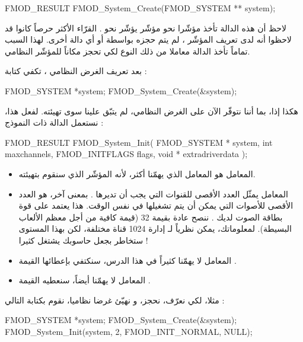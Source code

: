 \begin{Csource}
FMOD_RESULT FMOD_System_Create(FMOD_SYSTEM ** system);
\end{Csource}

لاحظ أن هذه الدالة تأخذ مؤشّرا نحو مؤشّر يؤشّر نحو
.
القرّاء الأكثر حرصاً كانوا قد لاحظوا أنه لدى تعريف المؤشّر
،
لم يتم حجزه بواسطة
أو أي دالة أخرى. لهذا السبب تماماً تأخذ الدالة
معاملا من ذلك النوع لكي تحجز مكاناً للمؤشّر النظامي.

بعد تعريف الغرض النظامي ، تكفي كتابة :

\begin{Csource}
FMOD_SYSTEM *system;
FMOD_System_Create(&system);
\end{Csource}

هكذا إذا، بما أننا نتوفّر الآن على الغرض النظامي، لم يتبّق علينا سوى تهيئته. لفعل هذا، نستعمل الدالة
ذات النموذج :
\begin{Csource}
FMOD_RESULT FMOD_System_Init(
	FMOD_SYSTEM *  system,
	int  maxchannels,
	FMOD_INITFLAGS  flags,
	void *  extradriverdata
);
\end{Csource}

\begin{itemize}
	\item المعامل
	هو المعامل الذي يهمّنا أكثر، لأنه المؤشّر الذي سنقوم بتهيئته.
	\item المعامل
	يمثّل العدد الأقصى للقنوات التي يجب أن تديرها
	.
	بمعنى آخر، هو العدد الأقصى للأصوات التي يمكن أن يتم تشغيلها في نفس الوقت. هذا يعتمد على قوة بطاقة الصوت لديك . ننصح عادة بقيمة 32 (قيمة كافية من أجل معظم الألعاب البسيطة). لمعلوماتك، يمكن نظرياً لـ
	إدارة 1024 قناة مختلفة، لكن بهذا المستوى ستخاطر بجعل حاسوبك يشتغل كثيرا !
	\item المعامل
	لا يهمّنا كثيراً في هذا الدرس، سنكتفي بإعطائها القيمة
	.
	\item المعامل
	لا يهمّنا أيضاً، سنعطيه القيمة
	.
\end{itemize}

مثلا، لكي نعرّف، نحجز، و نهيّئ غرضا نظاميا،  نقوم بكتابة التالي :

\begin{Csource}
FMOD_SYSTEM *system;
FMOD_System_Create(&system);
FMOD_System_Init(system, 2, FMOD_INIT_NORMAL, NULL);
\end{Csource}

